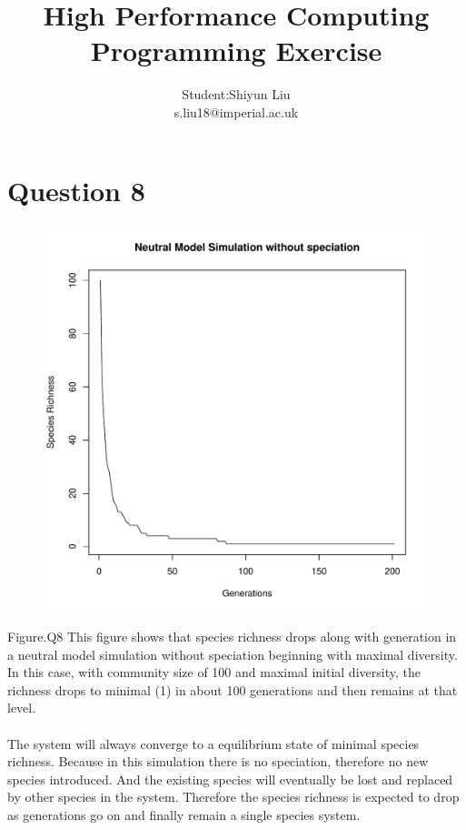 \documentclass[12pt,a4paper]{article}
\title{High Performance Computing Programming Exercise}
\author{Student:Shiyun Liu\\ s.liu18@imperial.ac.uk}
\date{ }
\begin{document}
\maketitle

\newpage

\section{Question 8}
\begin{figure}[h]
\centering
\includegraphics[width=\textwidth]{Q8Plot.pdf}
\end{figure}

Figure.Q8 This figure shows that species richness drops along with generation in a neutral model simulation without speciation beginning with maximal diversity. 
In this case, with community size of 100 and maximal initial diversity, the richness drops to minimal (1) in about 100 generations and then remains at that level.
\\
\\
The system will always converge to a equilibrium state of minimal species richness. 
Because in this simulation there is no speciation, therefore no new species introduced.
And the existing species will eventually be lost and replaced by other species in the system.
Therefore the species richness is expected to drop as generations go on and finally remain a single species system.
\end{document}
